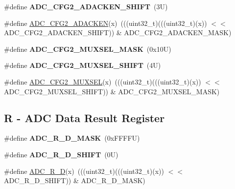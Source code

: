 \begin{DoxyCompactItemize}
\mbox{\label{group___a_d_c___register___masks_gad009e6fe93b9f44fb0f79cd479d8bb1a}} 
\#define {\bfseries A\+D\+C\+\_\+\+C\+F\+G2\+\_\+\+A\+D\+A\+C\+K\+E\+N\+\_\+\+S\+H\+I\+FT}~(3\+U)
\item 
\#define \mbox{\hyperlink{group___a_d_c___register___masks_ga50dca8b1fee08be88a54965c18aa3f34}{A\+D\+C\+\_\+\+C\+F\+G2\+\_\+\+A\+D\+A\+C\+K\+EN}}(x)~(((uint32\+\_\+t)(((uint32\+\_\+t)(x)) $<$$<$ A\+D\+C\+\_\+\+C\+F\+G2\+\_\+\+A\+D\+A\+C\+K\+E\+N\+\_\+\+S\+H\+I\+FT)) \& A\+D\+C\+\_\+\+C\+F\+G2\+\_\+\+A\+D\+A\+C\+K\+E\+N\+\_\+\+M\+A\+SK)
\item 
\mbox{\label{group___a_d_c___register___masks_ga5c50199c9b27cb92554a647909c6338a}} 
\#define {\bfseries A\+D\+C\+\_\+\+C\+F\+G2\+\_\+\+M\+U\+X\+S\+E\+L\+\_\+\+M\+A\+SK}~(0x10\+U)
\item 
\mbox{\label{group___a_d_c___register___masks_ga3d74b5bda99558af8b4f0e986ef7ea9b}} 
\#define {\bfseries A\+D\+C\+\_\+\+C\+F\+G2\+\_\+\+M\+U\+X\+S\+E\+L\+\_\+\+S\+H\+I\+FT}~(4\+U)
\item 
\#define \mbox{\hyperlink{group___a_d_c___register___masks_ga6aeafd3ea1d2b27884cf4d6b15818398}{A\+D\+C\+\_\+\+C\+F\+G2\+\_\+\+M\+U\+X\+S\+EL}}(x)~(((uint32\+\_\+t)(((uint32\+\_\+t)(x)) $<$$<$ A\+D\+C\+\_\+\+C\+F\+G2\+\_\+\+M\+U\+X\+S\+E\+L\+\_\+\+S\+H\+I\+FT)) \& A\+D\+C\+\_\+\+C\+F\+G2\+\_\+\+M\+U\+X\+S\+E\+L\+\_\+\+M\+A\+SK)
\end{DoxyCompactItemize}
\subsection*{R -\/ A\+DC Data Result Register}
\begin{DoxyCompactItemize}
\item 
\mbox{\label{group___a_d_c___register___masks_ga7dadc81f58826b303fb83918820cd177}} 
\#define {\bfseries A\+D\+C\+\_\+\+R\+\_\+\+D\+\_\+\+M\+A\+SK}~(0x\+F\+F\+F\+F\+U)
\item 
\mbox{\label{group___a_d_c___register___masks_ga8e2365e522772584a5ee2dd6a8b0987a}} 
\#define {\bfseries A\+D\+C\+\_\+\+R\+\_\+\+D\+\_\+\+S\+H\+I\+FT}~(0\+U)
\item 
\#define \mbox{\hyperlink{group___a_d_c___register___masks_ga170d774b5b873c5b8355cd8a57810f32}{A\+D\+C\+\_\+\+R\+\_\+D}}(x)~(((uint32\+\_\+t)(((uint32\+\_\+t)(x)) $<$$<$ A\+D\+C\+\_\+\+R\+\_\+\+D\+\_\+\+S\+H\+I\+FT)) \& A\+D\+C\+\_\+\+R\+\_\+\+D\+\_\+\+M\+A\+SK)
\end{DoxyCompactItemize}
